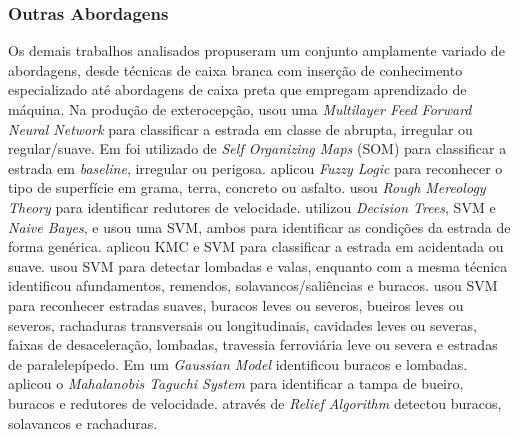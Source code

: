 \subsubsection{Outras Abordagens}

Os demais trabalhos analisados propuseram um conjunto amplamente variado de abordagens, desde técnicas de caixa branca com inserção de conhecimento especializado até abordagens de caixa preta que empregam aprendizado de máquina. Na produção de exterocepção,  usou uma \textit{Multilayer Feed Forward Neural Network} para classificar a estrada em classe de abrupta, irregular ou regular/suave. Em  foi utilizado de \textit{Self Organizing Maps} (SOM) para classificar a estrada em \textit{baseline}, irregular ou perigosa.  aplicou \textit{Fuzzy Logic} para reconhecer o tipo de superfície em grama, terra, concreto ou asfalto.  usou \textit{Rough Mereology Theory} para identificar redutores de velocidade.  utilizou \textit{Decision Trees}, SVM e \textit{Naive Bayes}, e  usou uma SVM, ambos para identificar as condições da estrada de forma genérica.  aplicou KMC e SVM para classificar a estrada em acidentada ou suave.  usou SVM para detectar lombadas e valas, enquanto  com a mesma técnica identificou afundamentos, remendos, solavancos/saliências e buracos.  usou SVM para reconhecer estradas suaves, buracos leves ou severos, bueiros leves ou severos, rachaduras transversais ou longitudinais, cavidades leves ou severas, faixas de desaceleração, lombadas, travessia ferroviária leve ou severa e estradas de paralelepípedo. Em  um \textit{Gaussian Model} identificou buracos e lombadas.  aplicou o \textit{Mahalanobis Taguchi System} para identificar a tampa de bueiro, buracos e redutores de velocidade.  através de \textit{Relief Algorithm} detectou buracos, solavancos e rachaduras.

